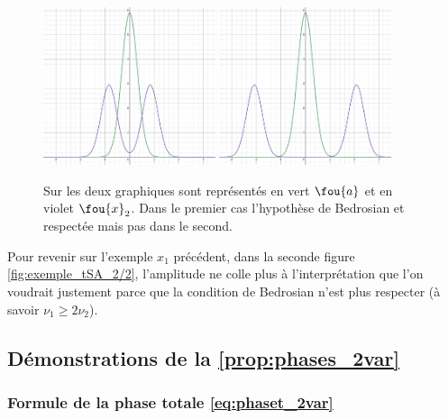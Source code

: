 \begin{figure}[h]\centering
	\includegraphics[width=0.45\textwidth]{fig/part-1/bedro condi 1.png} 
	\hfill
	\includegraphics[width=0.45\textwidth]{fig/part-1/bedro condi 2.png} 
	\caption{Sur les deux graphiques sont représentés en vert $\fou{a}$ et en violet $\fou{x}_2$. Dans le premier cas l'hypothèse de Bedrosian et respectée mais pas dans le second.}
	\label{fig:alising-ish}
\end{figure}


Pour revenir sur l'exemple $x_1$ précédent, dans la seconde figure \ref{fig:exemple_tSA_2/2}, l'amplitude ne colle plus à l'interprétation que l'on voudrait justement parce que la condition de Bedrosian n'est plus respecter (à savoir $\nu_1\geq 2\nu_2$). 




\subsection{Démonstrations de la \cref{prop:phases_2var}}\label{ann:demo_phases_2var}

\subsubsection{Formule de la phase totale \eqref{eq:phaset_2var}}

